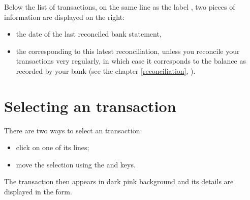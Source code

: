 Below the list of transactions, on the same line as the label , two pieces of information are displayed on the right:
\begin{itemize}
	\item the date of the last reconciled bank statement,
	\item the  corresponding to this latest reconciliation, unless you reconcile your transactions very regularly, in which case it corresponds to the balance as recorded by your bank (see the chapter \vref{reconciliation}, ).
\end{itemize}


\section{Selecting an transaction\label{transactions-selection}}

There are two ways to select an transaction:
\begin{itemize}
	 \item click on one of its lines;
	 \item move the selection using the \keys{\arrowkeyup} and \keys{\arrowkeydown} keys.
\end{itemize}

The transaction then appears in \colorbox[RGB]{245,155,155}{dark pink background} and its details are displayed in the form.

